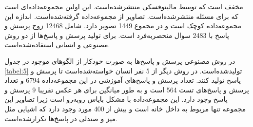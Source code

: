 	 مخفف
است که توسط مالینوفسکی منتشر‌شده‌است. این اولین مجموعه‌داده‌ای است که برای مسئله 
 منتشر‌شده‌است. تصاویر از مجموعه‌داده
  \cite{silberman2012indoor}
   گرفته‌شده‌است.  اندازه این مجموعه‌داده کوچک است و در مجموع 1449 تصویر دارد. 
 شامل 12468 زوج پرسش و پاسخ با 2483 سوال منحصربه‌فرد است. برای تولید پرسش و پاسخ‌ها از دو روش مصنوعی و انسانی استفاده‌شده‌است. 
 \begin{table}
 	 \caption{
 		الگوهای استفاده شده برای تولید  سوال در مجموعه‌داده 
 		.
 		سوالات می‌تواند در مورد یک تصویر و یا مجموعه‌ای از تصاویر باشد
 		\cite{malinowski2014multi}
 	.}
 	\label{tabel:5}
 \end{table}
 در روش مصنوعی پرسش و پاسخ‌ها به صورت خودکار از الگوهای موجود در جدول
 \ref{tabel:5}
  تولید‌شده‌است. در روش دیگر از 5 نفر انسان خواسته‌شده‌است تا پرسش و پاسخ تولید کنند. تعداد پرسش و پاسخ‌های آموزشی در این مجموعه‌داده 6794 و تعداد پرسش و پاسخ‌های تست 564 است و به طور میانگین برای هر عکس تقریبا 9 پرسش و پاسخ وجود دارد. این مجموعه‌داده با مشکل بایاس روبه‌رو است زیرا تصاویر این مجموعه تنها مربوط به داخل خانه است و بیش از 400 مورد وجود دارد که اشیایی مثل میز و صندلی در پاسخ‌ها تکرارشده‌است.
  
